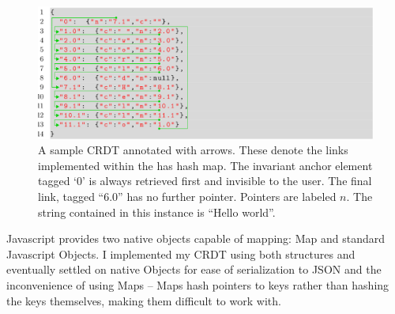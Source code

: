 \documentclass[12pt,a4paper,twoside,openright]{report}
\begin{document}
		
		


	\begin{figure}[H]
		\centering
		\includegraphics[width=1\linewidth]{figs/hash_list.eps}
		\caption[Annotated CRDT]{A sample CRDT annotated with arrows. These denote the links implemented within the has hash map. The invariant anchor element tagged `0' is always retrieved first and invisible to the user. The final link, tagged ``6.0'' has no further pointer. Pointers are labeled $n$. The string contained in this instance is ``Hello world''.}
		\label{fig:hashlist}
		\end{figure}
		
		Javascript provides two native objects capable of mapping: Map and standard Javascript Objects. I implemented my CRDT using both structures and eventually settled on native Objects for ease of serialization to JSON and the inconvenience of using Maps -- Maps hash pointers to keys rather than hashing the keys themselves, making them difficult to work with.
		
\end{document}
